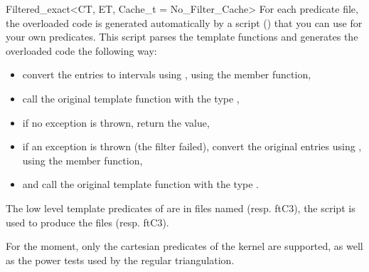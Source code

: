 \begin{ccClassTemplate}{Filtered_exact<CT, ET, Cache_t = No_Filter_Cache>}
For each predicate file, the overloaded code is generated automatically by a
 script () that you can
use for your own predicates. %
This script parses the template functions and generates the
overloaded code the following way:
\begin{itemize}
\item convert the entries to intervals using
    ,
    using the  member function,
\item call the original template function with the type
    ,
\item if no exception is thrown, return the value,
\item if an exception is thrown (the filter failed), convert the original
    entries using , using the  member
    function,
\item and call the original template function with the type .
\end{itemize}

\ccExample

The low level template predicates of {\cgal} are in files named
 (resp. ftC3), the script is used
to produce the files 
(resp. ftC3).

For the moment, only the cartesian predicates of the kernel are supported,
as well as the power tests used by the regular triangulation.

\end{ccClassTemplate}
